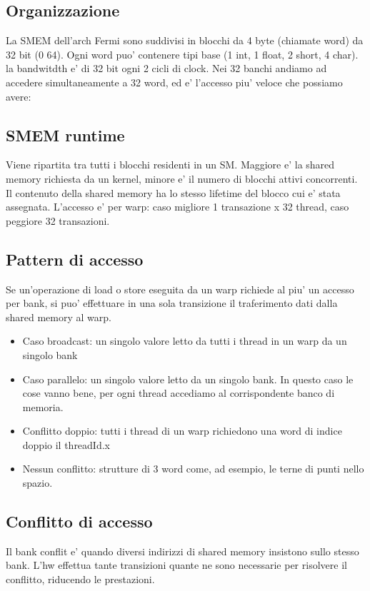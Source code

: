 
\subsection{Organizzazione}
La SMEM dell'arch Fermi sono suddivisi in blocchi da 4 byte (chiamate word) da 32 bit (0 64). Ogni word puo' contenere tipi base (1 int, 1 float, 2 short, 4 char).
la bandwitdth e' di 32 bit ogni 2 cicli di clock.
Nei 32 banchi andiamo ad accedere simultaneamente a 32 word, ed e' l'accesso piu' veloce che possiamo avere:

\subsection{SMEM runtime}
Viene ripartita tra tutti i blocchi residenti in un SM. Maggiore e' la shared memory richiesta da un kernel, minore e' il numero di blocchi attivi concorrenti. Il contenuto della shared memory ha lo stesso lifetime del blocco cui e' stata assegnata. L'accesso e' per warp: caso migliore 1 transazione x 32 thread, caso peggiore 32 transazioni.

\subsection{Pattern di accesso}
Se un'operazione di load o store eseguita da un warp richiede al piu' un accesso per bank, si puo' effettuare in una sola transizione il traferimento dati dalla shared memory al warp.


\begin{itemize}
    \item Caso broadcast: un singolo valore letto da tutti i thread in un warp da un singolo bank
    \item Caso parallelo: un singolo valore letto da un singolo bank. In questo caso le cose vanno bene, per ogni thread accediamo al corrispondente banco di memoria.
    \item Conflitto doppio: tutti i thread di un warp richiedono una word di indice doppio il threadId.x
    \item Nessun conflitto: strutture di 3 word come, ad esempio, le terne di punti nello spazio.
\end{itemize}

\subsection{Conflitto di accesso}
Il bank conflit e' quando diversi indirizzi di shared memory insistono sullo stesso bank. L'hw effettua tante transizioni quante ne sono necessarie per risolvere il conflitto, riducendo le prestazioni.

